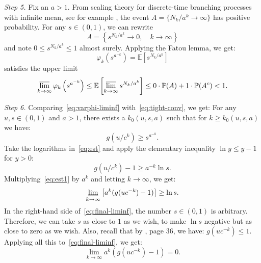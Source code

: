 \documentclass[12pt]{amsart}
\theoremstyle{remark}
\theoremstyle{definition}
\begin{document}
{\it Step 5.} Fix an $a > 1$. From scaling theory for discrete-time branching processes with infinite mean, see for example \cite[Theorem 4.4]{Seneta1969}, the event 
$A = \{N_k/a^k \to \infty\}$ has positive probability. For any $s \in (0, 1)$, we can rewrite
$$
A = \left\{s^{N_k/a^k} \to 0,\quad k \to \infty\right\}
$$
and note $0 \le s^{N_k/a^k} \le 1$ almost surely. Applying the Fatou lemma, we get:
$$
\varphi_k\left(s^{a^{-k}}\right) = \mathbb E\left[s^{N_k/a^k}\right] 
$$
satisfies the upper limit
\begin{equation}
\label{eq:varphi-liminf}
\varlimsup\limits_{k \to \infty}\varphi_k\left(s^{a^{-k}}\right) \le \mathbb E\left[\varlimsup\limits_{k \to \infty}s^{N_k/a^k}\right]\le 0 \cdot \mathbb P(A) + 1\cdot \mathbb P(A^c) < 1. 
\end{equation}

{\it Step 6.} Comparing~\eqref{eq:varphi-liminf} with~\eqref{eq:tight-conv}, we get: For any $u, s \in (0, 1)$ and $a > 1$, there exists a $k_0(u, s, a)$ such that for $k \ge k_0(u, s, a)$ we have: 
\begin{equation}
\label{eq:est}
g(u/c^k) \ge s^{a^{-k}}.
\end{equation}
Take the logarithms in~\eqref{eq:est} and apply the elementary inequality $\ln y \le y - 1$ for $y > 0$:
\begin{equation}
\label{eq:est1}
g(u/c^k) - 1 \ge a^{-k}\ln s.
\end{equation}
Multiplying~\eqref{eq:est1} by $a^k$ and letting $k \to \infty$, we get:
\begin{equation}
\label{eq:final-liminf}
\varliminf\limits_{k \to \infty}\left[a^{k}(g(uc^{-k}) - 1)\right] \ge \ln s.
\end{equation}
In the right-hand side of~\eqref{eq:final-liminf}, the number $s \in (0, 1)$ is arbitrary. Therefore, we can take $s$ as close to $1$ as we wish, to make $\ln s$ negative but as close to zero as we wish. Also, recall that by \cite[Chapter 2]{FTbook}, page 36, we have: $g(uc^{-k}) \le 1$. Applying all this to~\eqref{eq:final-liminf}, we get:
\begin{equation}
\label{eq:lim}
\lim\limits_{k \to \infty}a^{k}(g(uc^{-k}) - 1) = 0.
\end{equation}
\end{document}
